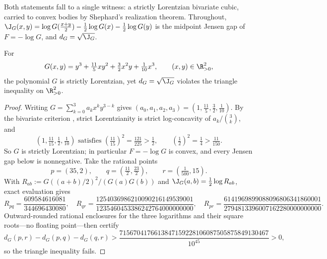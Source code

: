 Both statements fall to a single witness: a strictly Lorentzian bivariate cubic, carried to convex bodies by Shephard's realization theorem.  Throughout, $\J_G(x,y)=\log G(\frac{x+y}2)-\frac12\log G(x)-\frac12\log G(y)$ is the midpoint Jensen gap of $F=-\log G$, and $d_G=\sqrt{\J_G}$.

\begin{theorem}\label{thm:lorentzian}
For
\begin{equation}\label{eq:lorentzian-cubic}
G(x,y)=y^3+\tfrac{11}5xy^2+\tfrac32x^2y+\tfrac1{10}x^3,\qquad(x,y)\in\R_{>0}^2,
\end{equation}
the polynomial $G$ is strictly Lorentzian, yet $d_G=\sqrt{\J_G}$ violates the triangle inequality on $\R_{>0}^2$.
\end{theorem}
\begin{proof}
Writing $G=\sum_{k=0}^3a_kx^ky^{3-k}$ gives $(a_0,a_1,a_2,a_3)=(1,\frac{11}5,\frac32,\frac1{10})$.  By the bivariate criterion \cite[Example~2.3]{BrandenHuh}, strict Lorentzianity is strict log-concavity of $a_k/\binom3k$, and
\[
\left(1,\tfrac{11}{15},\tfrac12,\tfrac1{10}\right)
\text{ satisfies }
\left(\tfrac{11}{15}\right)^2=\tfrac{121}{225}>\tfrac12,\qquad
\left(\tfrac12\right)^2=\tfrac14>\tfrac{11}{150}.
\]
So $G$ is strictly Lorentzian; in particular $F=-\log G$ is convex, and every Jensen gap below is nonnegative.  Take the rational points
\begin{equation}\label{eq:lorentzian-points}
p=(35,2),\qquad q=\left(\tfrac{11}2,\tfrac{23}2\right),\qquad r=\left(\tfrac1{500},15\right).
\end{equation}
With $R_{ab}:=G((a+b)/2)^2/(G(a)G(b))$ and $\J_G(a,b)=\frac12\log R_{ab}$, exact evaluation gives
\[
R_{pq}=\frac{609584616081}{344696430080},\quad
R_{qr}=\frac{1254036986210090216149539001}{1235460453386242764000000000},\quad
R_{pr}=\frac{6141969899088096806341860001}{2794813396007162280000000000}.
\]
Outward-rounded rational enclosures for the three logarithms and their square roots---no floating point---then certify
\[
d_G(p,r)-d_G(p,q)-d_G(q,r)>\frac{7156704176613847159228106087505875849130467}{10^{45}}>0,
\]
so the triangle inequality fails.
\end{proof}

